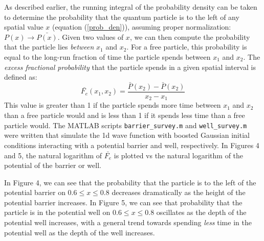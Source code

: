 \documentclass[10pt]{article}
\def\code#1{\texttt{#1}} %
\begin{document}
As described earlier, the running integral of the probability density can be taken to determine the 
probability that the quantum particle is to the left of any spatial value $x$
(equation (\ref{prob_den})), assuming proper normalization: $P(x) \rightarrow \bar{P(x)}$. 
Given two values of $x$, we can then compute the probability that the particle lies \textit{between}
$x_1$ and $x_2$. For a free particle, this probability is equal to the long-run fraction of time the 
particle spends between $x_1$ and $x_2$. The \textit{excess fractional probability} that the particle
spends in a given spatial interval is defined as:
\begin{equation}\label{Fe}
\bar{F_e}(x_1, x_2) = \frac{\bar{P}(x_2) - \bar{P}(x_2)}{x_2 - x_1}
\end{equation}
This value is greater than 1 if the particle spends more time between $x_1$ and $x_2$ than a free 
particle would and is less than 1 if it spends less time than a free particle would. The MATLAB 
scripts \code{barrier\_survey.m} and \code{well\_survey.m} were written that simulate the 1d 
wave function with boosted Gaussian initial conditions interacting with a potential barrier and well,
respectively. In Figures 4 and 5, the natural logarithm of $\bar{F_e}$ is plotted vs the natural 
logarithm of the potential of the barrier or well. 

In Figure 4, we can see that the probability that the particle is to the left of the potential 
barrier on $0.6 \leq x \leq 0.8$ decreases dramatically as the height of the potential barrier 
increases. In Figure 5, we can see that probability that the particle is in the potential well
on $0.6 \leq x \leq 0.8$ oscillates as the depth of the potential well increases, with a general 
trend towards spending \textit{less} time in the potential well as the depth of the well increases.
\end{document}
